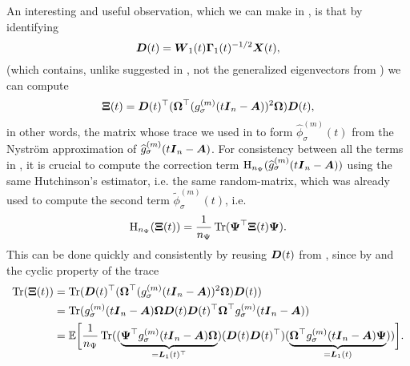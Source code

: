 An interesting and useful observation, which we can make in ,
is that by identifying
\begin{equation}
    \boldsymbol{D}(t) = \boldsymbol{W}_1(t) \boldsymbol{\Gamma}_1(t)^{-1/2} \boldsymbol{X}(t),
    \label{equ:4-nystromchebyshev-generalized-eigenvector}
\end{equation}
(which contains, unlike suggested in \cite[algorithm~4]{lin2017randomized},
not the generalized eigenvectors from )
we can compute
\begin{equation}
    \boldsymbol{\Xi}(t) = \boldsymbol{D}(t)^{\top} (\boldsymbol{\Omega}^{\top} (g_{\sigma}^{(m)}(t\boldsymbol{I}_n - \boldsymbol{A}))^2 \boldsymbol{\Omega}) \boldsymbol{D}(t),
    \label{equ:4-nystromchebyshev-generalized-eigenvector-xi}
\end{equation}
in other words, the matrix whose trace we used in 
to form $\widehat{\phi}_{\sigma}^{(m)}(t)$ from the Nystr\"om approximation of
$\widehat{g}_{\sigma}^{(m)}(t\boldsymbol{I}_n - \boldsymbol{A})$.
For consistency between all the terms in ,
it is crucial to compute the correction term $\operatorname{H}_{n_{\Psi}}(\widehat{g}_{\sigma}^{(m)}(t\boldsymbol{I}_n - \boldsymbol{A}))$
using the same Hutchinson's estimator, i.e. the same \gls{random-matrix}, which was already used to compute the
second term $\widetilde{\phi}_{\sigma}^{(m)}(t)$, i.e.
\begin{equation}
    \operatorname{H}_{n_{\Psi}}(\boldsymbol{\Xi}(t)) = \frac{1}{n_{\Psi}} \operatorname{Tr}(\boldsymbol{\Psi}^{\top} \boldsymbol{\Xi}(t) \boldsymbol{\Psi}).
\end{equation}
This can be done quickly and consistently by reusing $\boldsymbol{D}(t)$ from ,
since by  and the cyclic property of the trace
\begin{align*}
    \operatorname{Tr}(\boldsymbol{\Xi}(t))
    &= \operatorname{Tr}(\boldsymbol{D}(t)^{\top} (\boldsymbol{\Omega}^{\top} (g_{\sigma}^{(m)}(t\boldsymbol{I}_n - \boldsymbol{A}))^2 \boldsymbol{\Omega}) \boldsymbol{D}(t)) \notag \\
    &= \operatorname{Tr}( g_{\sigma}^{(m)}(t\boldsymbol{I}_n - \boldsymbol{A}) \boldsymbol{\Omega} \boldsymbol{D}(t) \boldsymbol{D}(t)^{\top} \boldsymbol{\Omega}^{\top} g_{\sigma}^{(m)}(t\boldsymbol{I}_n - \boldsymbol{A})) \notag \\
    &= \mathbb{E}\bigg[\frac{1}{n_{\Psi}} \operatorname{Tr}( (\underbrace{\boldsymbol{\Psi}^{\top} g_{\sigma}^{(m)}(t\boldsymbol{I}_n - \boldsymbol{A}) \boldsymbol{\Omega}}_{=\boldsymbol{L}_1(t)^{\top}})
                                               (\boldsymbol{D}(t) \boldsymbol{D}(t)^{\top})
                                               (\underbrace{\boldsymbol{\Omega}^{\top} g_{\sigma}^{(m)}(t\boldsymbol{I}_n - \boldsymbol{A}) \boldsymbol{\Psi}}_{=\boldsymbol{L}_1(t)})) \bigg].
    \label{equ:4-nystromchebyshev-generalized-eigenvector-trace}
\end{align*}

